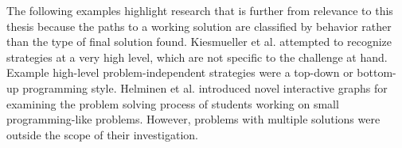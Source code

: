 \documentclass[12pt]{article}
\begin{document}
The following examples highlight research that is further from relevance to this thesis because the paths to a working solution are classified by behavior rather than the type of final solution found. Kiesmueller et al. \cite{Kiesmueller} attempted to recognize strategies at a very high level, which are not specific to the challenge at hand. Example high-level problem-independent strategies were a top-down or bottom-up programming style. Helminen et al. \cite{ICERHelminen} introduced novel interactive graphs for examining the problem solving process of students working on small programming-like problems. However, problems with multiple solutions were outside the scope of their investigation.



%
%





%
%
%
\end{document}
